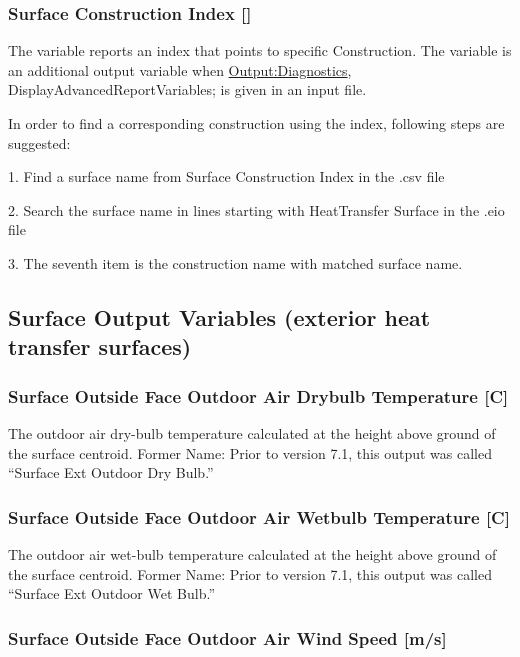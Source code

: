 \subsubsection{Surface Construction Index {[]}}\label{surface-construction-index}

The variable reports an index that points to specific Construction. The variable is an additional output variable when \hyperref[outputdiagnostics]{Output:Diagnostics}, DisplayAdvancedReportVariables; is given in an input file.

In order to find a corresponding construction using the index, following steps are suggested:

1. Find a surface name from Surface Construction Index in the .csv file

2. Search the surface name in lines starting with HeatTransfer Surface in the .eio file

3. The seventh item is the construction name with matched surface name.

\subsection{Surface Output Variables (exterior heat transfer surfaces)}\label{surface-output-variables-exterior-heat-transfer-surfaces}

\subsubsection{Surface Outside Face Outdoor Air Drybulb Temperature {[}C{]}}\label{surface-outside-face-outdoor-air-drybulb-temperature-c}

The outdoor air dry-bulb temperature calculated at the height above ground of the surface centroid. Former Name: Prior to version 7.1, this output was called ``Surface Ext Outdoor Dry Bulb.''

\subsubsection{Surface Outside Face Outdoor Air Wetbulb Temperature {[}C{]}}\label{surface-outside-face-outdoor-air-wetbulb-temperature-c}

The outdoor air wet-bulb temperature calculated at the height above ground of the surface centroid. Former Name: Prior to version 7.1, this output was called ``Surface Ext Outdoor Wet Bulb.''

\subsubsection{Surface Outside Face Outdoor Air Wind Speed {[}m/s{]}}\label{surface-outside-face-outdoor-air-wind-speed-ms}

